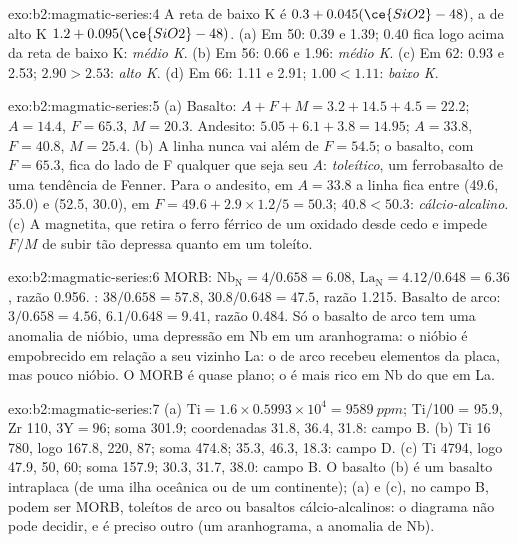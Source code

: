 \begin{solution}{exo:b2:magmatic-series:4}
A reta de baixo K é $0.3 + 0.045(\ce{SiO2} - 48)$, a de alto K $1.2 +
0.095(\ce{SiO2} - 48)$. (a) Em 50: 0.39 e 1.39; $0.40$ fica logo acima da reta de baixo K:
\emph{médio K}. (b) Em 56: 0.66 e 1.96: \emph{médio K}. (c) Em 62: 0.93 e 2.53;
$2.90 > 2.53$: \emph{alto K}. (d) Em 66: 1.11 e 2.91; $1.00 < 1.11$: \emph{baixo K}.
\end{solution}

\begin{solution}{exo:b2:magmatic-series:5}
(a) Basalto: $A + F + M = 3.2 + 14.5 + 4.5 = 22.2$; $A = 14.4$, $F = 65.3$, $M = 20.3$.
Andesito: $5.05 + 6.1 + 3.8 = 14.95$; $A = 33.8$, $F = 40.8$, $M = 25.4$. (b) A linha
nunca vai além de $F = 54.5$; o basalto, com $F = 65.3$, fica do lado de F
qualquer que seja seu $A$: \emph{toleítico}, um ferrobasalto de uma tendência de Fenner. Para o
andesito, em $A = 33.8$ a linha fica entre (49.6, 35.0) e (52.5, 30.0), em $F =
49.6 + 2.9\times1.2/5 = 50.3$; $40.8 < 50.3$: \emph{cálcio-alcalino}. (c) A magnetita,
que retira o ferro férrico de um  oxidado desde cedo e impede $F/M$ de
subir tão depressa quanto em um toleíto.
\end{solution}

\begin{solution}{exo:b2:magmatic-series:6}
MORB: $\mathrm{Nb_N} = 4/0.658 = 6.08$, $\mathrm{La_N} = 4.12/0.648 = 6.36$, razão
0.956. : $38/0.658 = 57.8$, $30.8/0.648 = 47.5$, razão 1.215. Basalto
de arco: $3/0.658 = 4.56$, $6.1/0.648 = 9.41$, razão 0.484. Só o basalto de arco tem uma
anomalia de nióbio, uma depressão em Nb em um aranhograma: o nióbio é empobrecido em relação a
seu vizinho La: o  de arco recebeu elementos da placa, mas pouco
nióbio. O MORB é quase plano; o  é mais rico
em Nb do que em La.
\end{solution}

\begin{solution}{exo:b2:magmatic-series:7}
(a) $\mathrm{Ti} = 1.6\times0.5993\times10^4 = \qty{9589}{ppm}$; Ti/100 = 95.9, Zr
110, $3\mathrm Y = 96$; soma 301.9; coordenadas 31.8, 36.4, 31.8: campo B. (b) Ti
16\,780, logo 167.8, 220, 87; soma 474.8; 35.3, 46.3, 18.3: campo D. (c) Ti 4794, logo
47.9, 50, 60; soma 157.9; 30.3, 31.7, 38.0: campo B. O basalto (b) é um basalto intraplaca
(de uma ilha oceânica ou de um continente); (a) e (c), no campo B, podem ser MORB, toleítos
de arco ou basaltos cálcio-alcalinos: o diagrama não pode decidir, e é preciso outro (um
aranhograma, a anomalia de Nb).
\end{solution}

